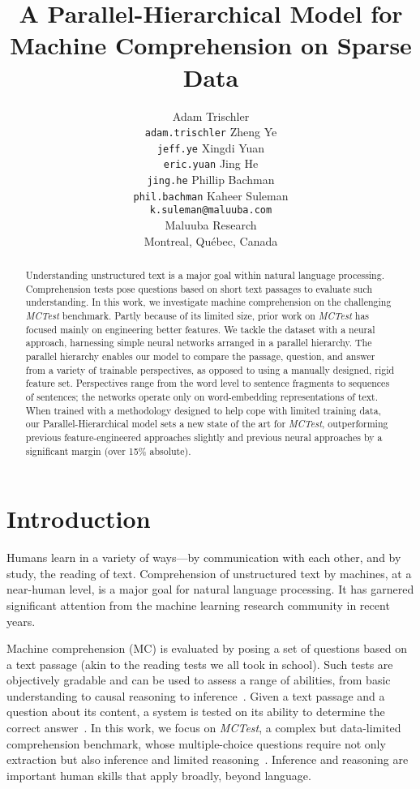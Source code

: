 \documentclass[11pt]{article}
\title{A Parallel-Hierarchical Model for Machine Comprehension on Sparse Data}
\author{Adam Trischler \\ {\tt adam.trischler} \And Zheng Ye \\ {\tt jeff.ye} \And Xingdi Yuan \\ {\tt eric.yuan} \And Jing He \\ {\tt jing.he} \And Phillip Bachman \\ {\tt phil.bachman} \AND
        Kaheer Suleman \\ {\tt k.suleman@maluuba.com} \\ Maluuba Research \\ Montreal, Qu\'{e}bec, Canada }
\date{}
\begin{document}
\maketitle

\begin{abstract}
Understanding unstructured text is a major goal within natural language processing. Comprehension tests pose questions based on short text passages to evaluate such understanding. In this work, we investigate machine comprehension on the challenging {\it MCTest} benchmark. Partly because of its limited size, prior work on {\it MCTest} has focused mainly on engineering better features. We tackle the dataset with a neural approach, harnessing simple neural networks arranged in a parallel hierarchy. The parallel hierarchy enables our model to compare the passage, question, and answer from a variety of trainable perspectives, as opposed to using a manually designed, rigid feature set. Perspectives range from the word level to sentence fragments to sequences of sentences; the networks operate only on word-embedding representations of text. When trained with a methodology designed to help cope with limited training data, our Parallel-Hierarchical model sets a new state of the art for {\it MCTest}, outperforming previous feature-engineered approaches slightly and previous neural approaches by a significant margin (over 15\% absolute).
\end{abstract}

\section{Introduction}
Humans learn in a variety of ways---by communication with each other, and by study, the reading of text. Comprehension of unstructured text by machines, at a near-human level, is a major goal for natural language processing. It has garnered significant attention from the machine learning research community in recent years.

Machine comprehension (MC) is evaluated by posing a set of questions based on a text passage (akin to the reading tests we all took in school). Such tests are objectively gradable and can be used to assess a range of abilities, from basic understanding to causal reasoning to inference~\cite{richardson2013}. Given a text passage and a question about its content, a system is tested on its ability to determine the correct answer~\cite{sachan2015}. In this work, we focus on {\it MCTest}, a complex but data-limited comprehension benchmark, whose multiple-choice questions require not only extraction but also inference and limited reasoning~\cite{richardson2013}. Inference and reasoning are important human skills that apply broadly, beyond language.
\end{document}
